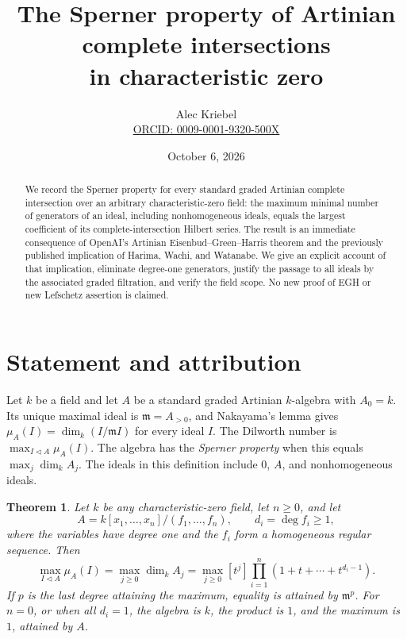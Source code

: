 \documentclass[11pt]{article}
\title{The Sperner property of Artinian complete intersections\\in characteristic zero}
\author{Alec Kriebel\\\small\href{https://orcid.org/0009-0001-9320-500X}{ORCID: 0009-0001-9320-500X}}
\date{October 6, 2026}
\newtheorem{theorem}{Theorem}
\newcommand{\m}{\mathfrak m}
\begin{document}
\maketitle
\begin{abstract}
We record the Sperner property for every standard graded Artinian complete
intersection over an arbitrary characteristic-zero field: the maximum
minimal number of generators of an ideal, including nonhomogeneous ideals,
equals the largest coefficient of its complete-intersection Hilbert
series. The result is an immediate consequence of OpenAI's Artinian
Eisenbud--Green--Harris theorem and the previously published implication
of Harima, Wachi, and Watanabe. We give an explicit account of that
implication, eliminate degree-one generators, justify the passage to all
ideals by the associated graded filtration, and verify the field scope.
No new proof of EGH or new Lefschetz assertion is claimed.
\end{abstract}

\section{Statement and attribution}
Let \(k\) be a field and let \(A\) be a standard graded Artinian
\(k\)-algebra with \(A_0=k\). Its unique maximal ideal is
\(\m=A_{>0}\), and Nakayama's lemma gives
\(\mu_A(I)=\dim_k(I/\m I)\) for every ideal \(I\).
The Dilworth number is \(\max_{I\triangleleft A}\mu_A(I)\).
The algebra has the \emph{Sperner property} when this equals
\(\max_j\dim_k A_j\). The ideals in this definition include \(0\),
\(A\), and nonhomogeneous ideals.

\begin{theorem}\label{thm:main}
Let \(k\) be any characteristic-zero field, let \(n\ge0\), and let
\[
 A=k[x_1,\ldots,x_n]/(f_1,\ldots,f_n),
 \qquad d_i=\deg f_i\ge1,
\]
where the variables have degree one and the \(f_i\) form a homogeneous
regular sequence. Then
\begin{equation}\label{eq:target}
 \max_{I\triangleleft A}\mu_A(I)
 =\max_{j\ge0}\dim_k A_j
 =\max_{j\ge0}[t^j]\prod_{i=1}^n(1+t+\cdots+t^{d_i-1}).
\end{equation}
If \(p\) is the last degree attaining the maximum, equality is attained
by \(\m^p\). For \(n=0\), or when all \(d_i=1\), the algebra is \(k\),
the product is \(1\), and the maximum is \(1\), attained by \(A\).
\end{theorem}
\end{document}
